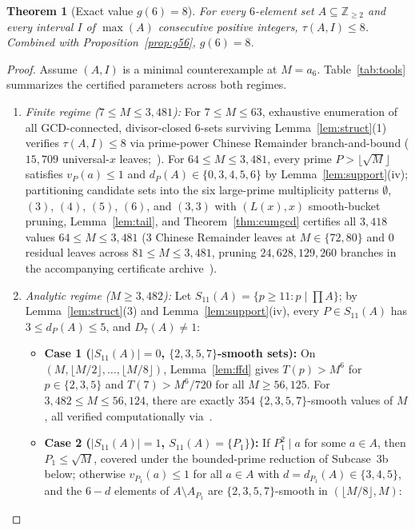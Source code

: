 \documentclass[11pt]{article}
\newtheorem{theorem}{Theorem}
\begin{document}
\begin{theorem}[Exact value $g(6) = 8$]
\label{thm:g6}
For every $6$-element set $A \subseteq \mathbb{Z}_{\ge 2}$ and every interval $I$ of $\max(A)$ consecutive positive integers, $\tau(A, I) \le 8$. Combined with Proposition~\ref{prop:g56}, $g(6) = 8$.
\end{theorem}
\begin{proof}
Assume $(A, I)$ is a minimal counterexample at $M = a_6$. Table~\ref{tab:tools} summarizes the certified parameters across both regimes.
\begin{enumerate}
\item \emph{Finite regime ($7 \le M \le 3{,}481$):} For $7 \le M \le 63$, exhaustive enumeration of all GCD-connected, divisor-closed $6$-sets surviving Lemma~\ref{lem:struct}(1) verifies $\tau(A, I) \le 8$ via prime-power Chinese Remainder branch-and-bound ($15{,}709$ universal-$x$ leaves;~\cite{bergstrom26smallcode}). For $64 \le M \le 3{,}481$, every prime $P > \lfloor \sqrt{M} \rfloor$ satisfies $v_P(a) \le 1$ and $d_P(A) \in \{0, 3, 4, 5, 6\}$ by Lemma~\ref{lem:support}(iv); partitioning candidate sets into the six large-prime multiplicity patterns $\emptyset$, $(3)$, $(4)$, $(5)$, $(6)$, and $(3, 3)$ with $(L(x), x)$ smooth-bucket pruning, Lemma~\ref{lem:tail}, and Theorem~\ref{thm:cumgcd} certifies all $3{,}418$ values $64 \le M \le 3{,}481$ ($3$ Chinese Remainder leaves at $M \in \{72, 80\}$ and $0$ residual leaves across $81 \le M \le 3{,}481$, pruning $24{,}628{,}129{,}260$ branches in the accompanying certificate archive~\cite{bergstrom26smallcode}).
\item \emph{Analytic regime ($M \ge 3{,}482$):} Let $S_{11}(A) = \{p \ge 11 : p \mid \prod A\}$; by Lemma~\ref{lem:struct}(3) and Lemma~\ref{lem:support}(iv), every $P \in S_{11}(A)$ has $3 \le d_P(A) \le 5$, and $D_7(A) \neq 1$:
\begin{itemize}
\item \textbf{Case 1 ($|S_{11}(A)| = 0$, $\{2, 3, 5, 7\}$-smooth sets):} On $(M, \lfloor M / 2 \rfloor, \dots, \lfloor M / 8 \rfloor)$, Lemma~\ref{lem:ffd} gives $T(p) > M^6$ for $p \in \{2, 3, 5\}$ and $T(7) > M^6 / 720$ for all $M \ge 56{,}125$. For $3{,}482 \le M \le 56{,}124$, there are exactly $354$ $\{2, 3, 5, 7\}$-smooth values of $M$, all verified computationally via~\cite{bergstrom26smallcode}.
\item \textbf{Case 2 ($|S_{11}(A)| = 1$, $S_{11}(A) = \{P_1\}$):} If $P_1^2 \mid a$ for some $a \in A$, then $P_1 \le \sqrt{M}$, covered under the bounded-prime reduction of Subcase~3b below; otherwise $v_{P_1}(a) \le 1$ for all $a \in A$ with $d = d_{P_1}(A) \in \{3, 4, 5\}$, and the $6 - d$ elements of $A \setminus A_{P_1}$ are $\{2, 3, 5, 7\}$-smooth in $(\lfloor M / 8 \rfloor, M)$:

\end{itemize}
\end{enumerate}
\end{proof}
\end{document}
